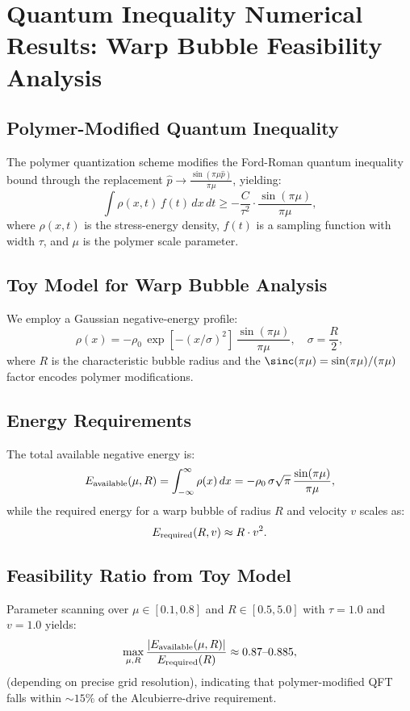 \documentclass[11pt]{article}
\begin{document}
\section*{Quantum Inequality Numerical Results: Warp Bubble Feasibility Analysis}

\subsection*{Polymer-Modified Quantum Inequality}
The polymer quantization scheme modifies the Ford-Roman quantum inequality bound through the replacement $\hat{p} \rightarrow \frac{\sin(\pi\mu\hat{p})}{\pi\mu}$, yielding:
\[
  \int \rho(x,t)\,f(t)\,dx\,dt \geq -\frac{C}{\tau^2} \cdot \frac{\sin(\pi\mu)}{\pi\mu},
\]
where $\rho(x,t)$ is the stress-energy density, $f(t)$ is a sampling function with width $\tau$, and $\mu$ is the polymer scale parameter.

\subsection*{Toy Model for Warp Bubble Analysis}
We employ a Gaussian negative-energy profile:
\[
  \rho(x) = -\rho_0\,\exp\left[-(x/\sigma)^2\right]\,\frac{\sin(\pi\mu)}{\pi\mu},\quad \sigma=\frac{R}{2},
\]
where $R$ is the characteristic bubble radius and the $\sinc(\pi\mu) = \sin(\pi\mu)/(\pi\mu)$ factor encodes polymer modifications.

\subsection*{Energy Requirements}
The total available negative energy is:
\[
  E_{\rm available}(\mu,R) = \int_{-\infty}^{\infty} \rho(x)\,dx = -\rho_0\,\sigma\sqrt{\pi}\,\frac{\sin(\pi\mu)}{\pi\mu},
\]
while the required energy for a warp bubble of radius $R$ and velocity $v$ scales as:
\[
  E_{\rm required}(R,v) \approx R \cdot v^2.
\]

\subsection*{Feasibility Ratio from Toy Model}
Parameter scanning over $\mu \in [0.1, 0.8]$ and $R \in [0.5, 5.0]$ with $\tau=1.0$ and $v=1.0$ yields:
\[
  \max_{\mu,R}\frac{|E_{\rm available}(\mu,R)|}{E_{\rm required}(R)} \approx 0.87\text{--}0.885,
\]
(depending on precise grid resolution), indicating that polymer-modified QFT falls within $\sim15\%$ of the Alcubierre-drive requirement.
\end{document}
